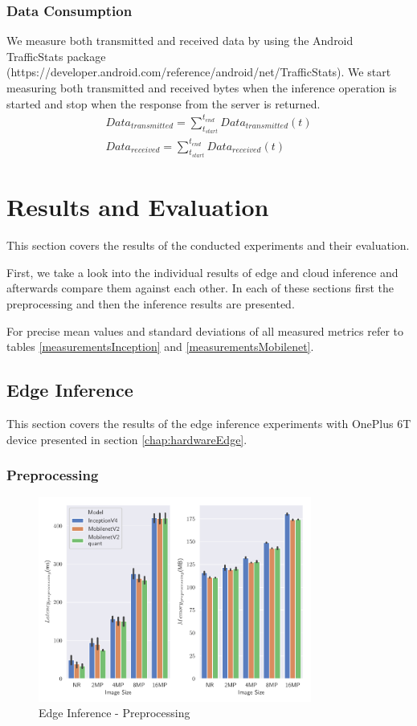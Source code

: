 \subsubsection{Data Consumption}
We measure both transmitted and received data by using the Android TrafficStats package (https://developer.android.com/reference/android/net/TrafficStats). We start measuring both transmitted and received bytes when the inference operation is started and stop when the response from the server is returned. 
\begin{equation*}
\begin{gathered}
Data_{transmitted} = \sum_{t_{start}}^{t_{end}} Data_{transmitted}(t)\\
Data_{received} = \sum_{t_{start}}^{t_{end}} Data_{received}(t)
\end{gathered}
\end{equation*}
\section{Results and Evaluation}
This section covers the results of the conducted experiments and their evaluation.

First, we take a look into the individual results of edge and cloud inference and afterwards compare them against each other. In each of these sections first the preprocessing and then the inference results are presented.

For precise mean values and standard deviations of all measured metrics refer to tables \ref{measurementsInception} and \ref{measurementsMobilenet}.
\subsection{Edge Inference}
This section covers the results of the edge inference experiments with OnePlus 6T device presented in section \ref{chap:hardwareEdge}.
\subsubsection{Preprocessing}
\begin{figure}[H]
\centering
\includegraphics[width=0.8\textwidth]{./Bilder/single_plots/edge_inference_plots/Edge_Inference_Preprocessing.pdf}
\caption{Edge Inference - Preprocessing}
\label{fig:EdgePrepro}
\end{figure}


